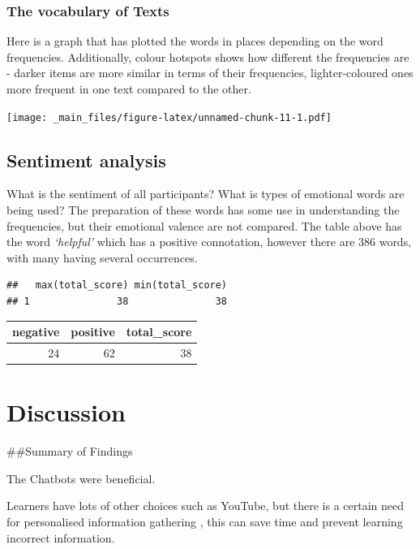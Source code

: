 \documentclass[a4paper, nobind]{templates/ociamthesis}
\begin{document}
\hypertarget{the-vocabulary-of-texts}{%
\subsection{The vocabulary of Texts}\label{the-vocabulary-of-texts}}

Here is a graph that has plotted the words in places depending on the
word frequencies. Additionally, colour hotspots shows how different the
frequencies are - darker items are more similar in terms of their
frequencies, lighter-coloured ones more frequent in one text compared to
the other.

\texttt{[image: \_main\_files/figure-latex/unnamed-chunk-11-1.pdf]}

\hypertarget{sentiment-analysis}{%
\section{Sentiment analysis}\label{sentiment-analysis}}

What is the sentiment of all participants? What is types of emotional
words are being used? The preparation of these words has some use in
understanding the frequencies, but their emotional valence are not
compared. The table above has the word \emph{`helpful'} which has a positive
connotation, however there are 386 words, with many having several
occurrences.

\begin{verbatim}
##   max(total_score) min(total_score)
## 1               38               38
\end{verbatim}

\begin{tabular}{r|r|r}
\hline
negative & positive & total\_score\\
\hline
24 & 62 & 38\\
\hline
\end{tabular}

\hypertarget{Discussion}{%
\chapter{Discussion}\label{Discussion}}

\minitoc 

\#\#Summary of Findings

The Chatbots were beneficial.

Learners have lots of other choices such as YouTube, but there is a certain need for personalised information gathering , this can save time and prevent learning incorrect information.
\end{document}
